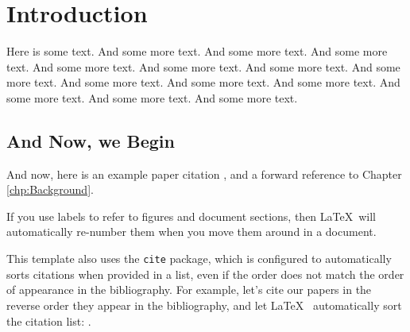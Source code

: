 \chapter{Introduction}
\label{chp:Introduction}

Here is some text. And some more text. And some more text. And some more text. And some more text. And some more text. And some more text. And some more text. And some more text. And some more text. And some more text. And some more text. And some more text. And some more text.

\section{And Now, we Begin}
\label{sec:begin}

And now, here is an example paper citation \cite{paper1}, and a forward reference to Chapter \ref{chp:Background}.

If you use labels to refer to figures and document sections, then \LaTeX~will automatically re-number them when you move them around in a document. 

This template also uses the {\tt cite} package, which is configured to automatically sorts citations when provided in a list, even if the order does not match the order of appearance in the bibliography. For example, let's cite our papers in the reverse order they appear in the bibliography, and let \LaTeX~ automatically sort the citation list: \cite{paper3, paper2, paper1}.